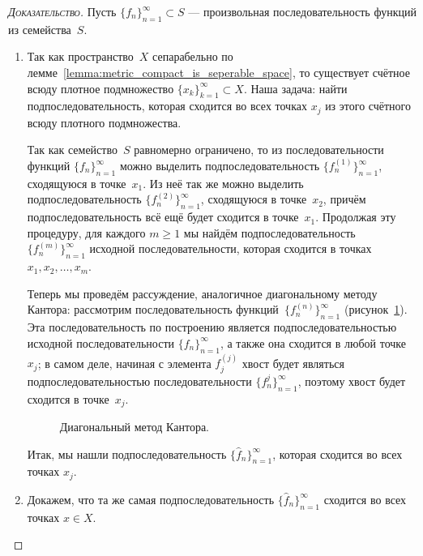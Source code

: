 \documentclass[../complex-analysis.tex]{subfiles}
\begin{document}
\begin{proof}[\normalfont\textsc{Доказательство}]
 Пусть $\{f_{n}\}_{n=1}^{\infty} \subset S $ --- произвольная последовательность функций из семейства~$ S $.

 \begin{enumerate}
  \item Так как пространство~$ X $ сепарабельно по лемме~\ref{lemma:metric_compact_is_seperable_space}, то существует счётное всюду плотное подмножество $ \{x_{k}\}_{k=1}^{\infty} \subset X  $. Наша задача: найти подпоследовательность, которая сходится во всех точках $ x_j $ из этого счётного всюду плотного подмножества.

   Так как семейство~$ S $  равномерно ограничено, то из последовательности функций $ \{f_{n}\}_{n=1}^{\infty}  $ можно выделить подпоследовательность $ \{f_{n}^{(1)}\}_{n=1}^{\infty}  $, сходящуюся в точке~$ x_1 $. Из неё так же можно выделить подпоследовательность $ \{f_{n}^{(2)}\}_{n=1}^{\infty}  $, сходящуюся в точке~$ x_2 $, причём подпоследовательность всё ещё будет сходится в точке~$ x_1 $. Продолжая эту процедуру, для каждого  $ m \geqslant 1 $  мы найдём подпоследовательность $ \{f_{n}^{(m)}\}_{n=1}^{\infty}  $ исходной последовательности, которая сходится в точках $ x_1, x_2, \ldots, x_m $.

   Теперь мы проведём рассуждение, аналогичное диагональному методу Кантора: рассмотрим последовательность функций~$ \{f_{n}^{(n)}\}_{n=1}^{\infty}  $ (рисунок~\ref{fig:cantor_diagonalization_theorem_arcel_askol}). Эта последовательность по построению является подпоследовательностью исходной последовательности $ \{f_{n}\}_{n=1}^{\infty}  $, а также она сходится в любой точке $ x_j $; в самом деле, начиная с элемента $ f_j^{(j)} $ хвост будет являться подпоследовательностью последовательности $ \{f_{n}^{j}\}_{n=1}^{\infty}  $, поэтому хвост будет сходится в точке~$ x_j $.

   \begin{figure}[ht]
    \centering
    \caption{Диагональный метод Кантора.}
    \label{fig:cantor_diagonalization_theorem_arcel_askol}
   \end{figure}

   Итак, мы нашли подпоследовательность $\{\hat f_{n}\}_{n=1}^{\infty} $, которая сходится во всех точках $ x_j $.

  \item Докажем, что та же самая подпоследовательность $ \{\hat f_{n}\}_{n=1}^{\infty}  $ сходится во всех точках $ x \in X $.


\end{enumerate}
\end{proof}
\end{document}
